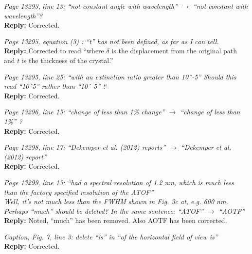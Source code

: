 \documentclass[12pt, notitlepage]{article}
\begin{document}
\textit{Page 13293, line 13: ``not constant angle with wavelength'' $\rightarrow$ ``not constant with wavelength''?}\\

\textbf{Reply:} Corrected.

\hrulefill

\textit{Page 13295, equation (3) : ``t'' has not been defined, as far as I can tell.}\\

\textbf{Reply:} Corrected to read ``where $\delta$ is the displacement from the original path and $t$ is the thickness of the crystal.''

\hrulefill

\textit{Page 13295, line 25: ``with an extinction ratio greater than 10ˆ-5''
Should this read ``10ˆ5'' rather than ``10ˆ-5'' ?}\\

\textbf{Reply:} Corrected.

\hrulefill

\textit{Page 13296, line 15: ``change of less than 1\% change'' $\rightarrow$ ``change of less than 1\%'' ?}\\

\textbf{Reply:} Corrected.

\hrulefill

\textit{Page 13298, line 17: ``Dekemper et al. (2012) reports'' $\rightarrow$ ``Dekemper et al. (2012)
report''}\\

\textbf{Reply:} Corrected.

\hrulefill

\textit{Page 13299, line 13: ``had a spectral resolution of 1.2 nm, which is much less than the
factory specified resolution of the ATOF''}\\

\textit{Well, it's not much less than the FWHM shown in Fig. 3c at, e.g. 600 nm. Perhaps
``much'' should be deleted? In the same sentence: ``ATOF'' $\rightarrow$ ``AOTF''}\\

\textbf{Reply:} Noted, ``much'' has been removed. Also AOTF has been corrected.

\hrulefill

\textit{Caption, Fig. 7, line 3: delete ``is'' in ``of the horizontal field of view is''}\\

\textbf{Reply:} Corrected.

\hrulefill
\end{document}
